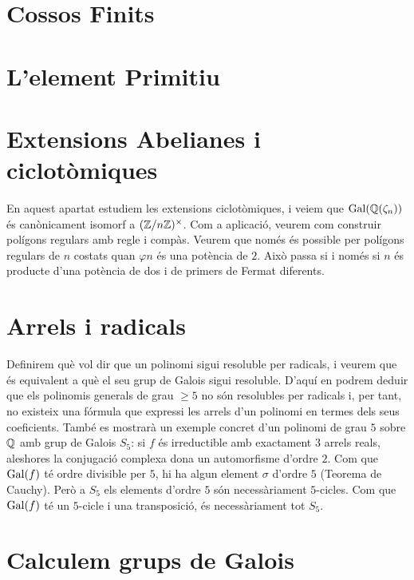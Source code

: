 \documentclass[
]{book}
\theoremstyle{definition}
\theoremstyle{definition}
\theoremstyle{definition}
\theoremstyle{definition}
\theoremstyle{remark}
\begin{document}
\hypertarget{cossos-finits}{%
\chapter{Cossos Finits}\label{cossos-finits}}

\hypertarget{lelement-primitiu}{%
\chapter{L'element Primitiu}\label{lelement-primitiu}}

\hypertarget{extensions-abelianes-i-ciclotuxf2miques}{%
\chapter{Extensions Abelianes i ciclotòmiques}\label{extensions-abelianes-i-ciclotuxf2miques}}

En aquest apartat estudiem les extensions ciclotòmiques, i veiem que \(\operatorname{Gal}(\mathbb{Q}(\zeta_n))\)
és canònicament isomorf a \((\mathbb{Z}/n\mathbb{Z})^\times\). Com a aplicació, veurem com construir
polígons regulars amb regle i compàs. Veurem que només és possible per polígons regulars
de \(n\) costats quan \(\varphi{n}\) és una potència de \(2\). Això passa si i només si \(n\) és producte
d'una potència de dos i de primers de Fermat diferents.

\hypertarget{arrels-i-radicals}{%
\chapter{Arrels i radicals}\label{arrels-i-radicals}}

Definirem què vol dir que un polinomi sigui resoluble per radicals, i veurem
que és equivalent a què el seu grup de Galois sigui resoluble. D'aquí en podrem
deduir que els polinomis generals de grau \(\geq 5\) no són resolubles per radicals i,
per tant, no existeix una fórmula que expressi les arrels d'un polinomi en termes
dels seus coeficients. També es mostrarà un exemple concret d'un polinomi de grau \(5\) sobre \(\mathbb{Q}\)
amb grup de Galois \(S_5\): si \(f\) és irreductible amb exactament \(3\) arrels reals, aleshores la conjugació complexa dona un automorfisme d'ordre \(2\). Com que \(\operatorname{Gal}(f)\) té ordre divisible per \(5\), hi ha algun element \(\sigma\) d'ordre \(5\) (Teorema de Cauchy). Però a \(S_5\) els elements d'ordre \(5\) són necessàriament \(5\)-cicles. Com que \(\operatorname{Gal}(f)\) té un \(5\)-cicle i una transposició, és necessàriament tot \(S_5\).

\hypertarget{calculem-grups-de-galois}{%
\chapter{Calculem grups de Galois}\label{calculem-grups-de-galois}}

\nocite{*}

  
\end{document}
